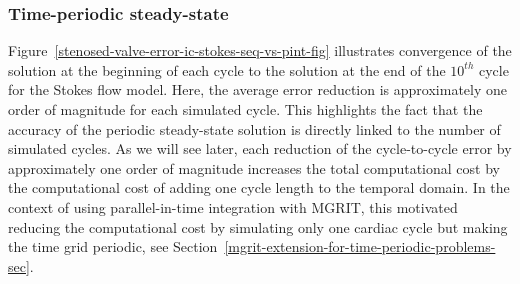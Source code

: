 \documentclass[3p]{elsarticle}
\begin{document}
\subsubsection{Time-periodic steady-state}
Figure~\ref{stenosed-valve-error-ic-stokes-seq-vs-pint-fig} illustrates convergence
of the solution at the beginning of each cycle
to the solution at the end of the $10^{th}$ cycle for the Stokes flow model.
Here, the average error reduction is approximately one order of magnitude
for each simulated cycle.
This highlights the fact that the accuracy of the periodic steady-state solution
is directly linked to the number of simulated cycles.
As we will see later, each reduction of the cycle-to-cycle error
by approximately one order of magnitude
increases the total computational cost by the computational cost of adding one cycle length
to the temporal domain.
In the context of using parallel-in-time integration with MGRIT,
this motivated reducing the computational cost
by simulating only one cardiac cycle but making the time grid periodic,
see Section~\ref{mgrit-extension-for-time-periodic-problems-sec}.
\FloatBarrier
\end{document}
